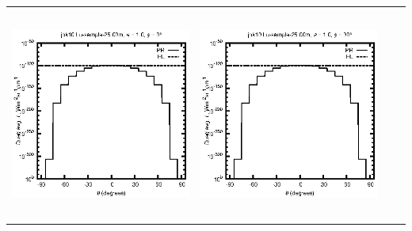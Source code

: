 \documentclass[10pt,a4paper]{article}
\begin{document}
\begin{adjustwidth}{-1.2in}{-1.2in}
\begin{tabular}{c c c c}
\includegraphics[height=7cm]{../eps/jok10_Lu_sample_25.00m_fwd.eps} &
\includegraphics[height=7cm]{../eps/jok10_Lu_sample_25.00m_cross.eps} \\
\end{tabular}

\pagebreak


\end{adjustwidth}
\end{document}
